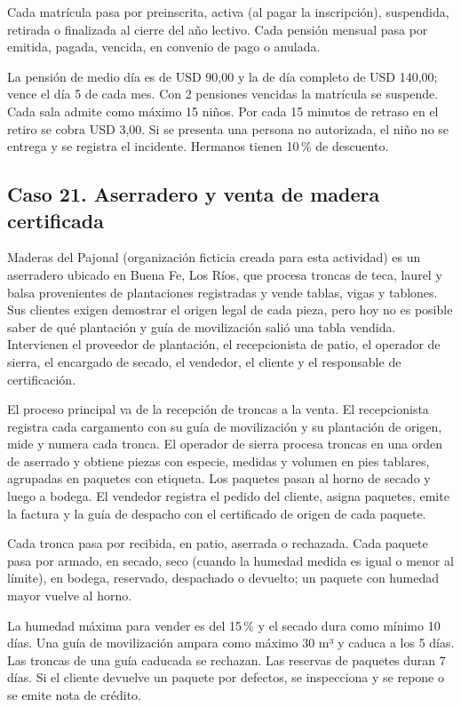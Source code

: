 \documentclass[11pt]{article}
\newcommand{\subseccion}[1]{\subsection{\textcolor{midblue}{#1}}}
\begin{document}
Cada matrícula pasa por preinscrita, activa (al pagar la inscripción), suspendida, retirada o finalizada al cierre del año lectivo. Cada pensión mensual pasa por emitida, pagada, vencida, en convenio de pago o anulada.

La pensión de medio día es de USD 90,00 y la de día completo de USD 140,00; vence el día 5 de cada mes. Con 2 pensiones vencidas la matrícula se suspende. Cada sala admite como máximo 15 niños. Por cada 15 minutos de retraso en el retiro se cobra USD 3,00. Si se presenta una persona no autorizada, el niño no se entrega y se registra el incidente. Hermanos tienen 10\,\% de descuento.

\subseccion{Caso 21. Aserradero y venta de madera certificada}
Maderas del Pajonal (organización ficticia creada para esta actividad) es un aserradero ubicado en Buena Fe, Los Ríos, que procesa troncas de teca, laurel y balsa provenientes de plantaciones registradas y vende tablas, vigas y tablones. Sus clientes exigen demostrar el origen legal de cada pieza, pero hoy no es posible saber de qué plantación y guía de movilización salió una tabla vendida. Intervienen el proveedor de plantación, el recepcionista de patio, el operador de sierra, el encargado de secado, el vendedor, el cliente y el responsable de certificación.

El proceso principal va de la recepción de troncas a la venta. El recepcionista registra cada cargamento con su guía de movilización y su plantación de origen, mide y numera cada tronca. El operador de sierra procesa troncas en una orden de aserrado y obtiene piezas con especie, medidas y volumen en pies tablares, agrupadas en paquetes con etiqueta. Los paquetes pasan al horno de secado y luego a bodega. El vendedor registra el pedido del cliente, asigna paquetes, emite la factura y la guía de despacho con el certificado de origen de cada paquete.

Cada tronca pasa por recibida, en patio, aserrada o rechazada. Cada paquete pasa por armado, en secado, seco (cuando la humedad medida es igual o menor al límite), en bodega, reservado, despachado o devuelto; un paquete con humedad mayor vuelve al horno.

La humedad máxima para vender es del 15\,\% y el secado dura como mínimo 10 días. Una guía de movilización ampara como máximo 30 m³ y caduca a los 5 días. Las troncas de una guía caducada se rechazan. Las reservas de paquetes duran 7 días. Si el cliente devuelve un paquete por defectos, se inspecciona y se repone o se emite nota de crédito.
\end{document}
